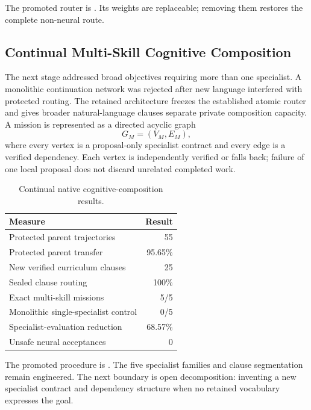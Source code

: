 The promoted router is
.  Its weights are
replaceable; removing them restores the complete non-neural route.

\subsection{Continual Multi-Skill Cognitive Composition}
\label{subsec:aion-native-composition}

The next stage addressed broad objectives requiring more than one specialist.
A monolithic continuation network was rejected after new language interfered
with protected routing.  The retained architecture freezes the established
atomic router and gives broader natural-language clauses separate private
composition capacity.  A mission is represented as a directed acyclic graph
\begin{equation}
G_M=(V_M,E_M),
\end{equation}
where every vertex is a proposal-only specialist contract and every edge is a
verified dependency.  Each vertex is independently verified or falls back;
failure of one local proposal does not discard unrelated completed work.

\begin{table}[htbp]
\centering
\caption{Continual native cognitive-composition results.}
\label{tab:aion-native-composition}
\begin{tabular}{@{}lr@{}}
\toprule
Measure & Result \\
\midrule
Protected parent trajectories & 55 \\
Protected parent transfer & 95.65\% \\
New verified curriculum clauses & 25 \\
Sealed clause routing & 100\% \\
Exact multi-skill missions & 5/5 \\
Monolithic single-specialist control & 0/5 \\
Specialist-evaluation reduction & 68.57\% \\
Unsafe neural acceptances & 0 \\
\bottomrule
\end{tabular}
\end{table}

The promoted procedure is
.  The five
specialist families and clause segmentation remain engineered.  The next
boundary is open decomposition: inventing a new specialist contract and
dependency structure when no retained vocabulary expresses the goal.

